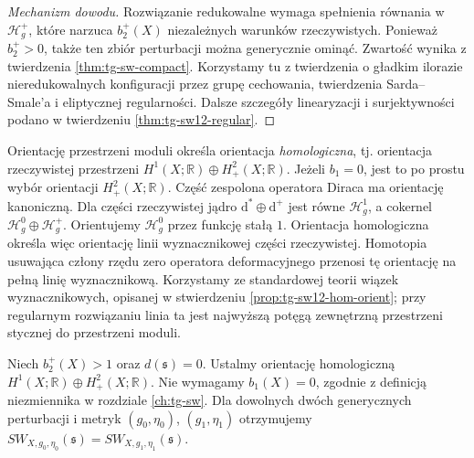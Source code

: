 \begin{proof}[Mechanizm dowodu]
Rozwiązanie redukowalne wymaga spełnienia równania w
$\mathcal H_g^+$, które narzuca $b_2^+(X)$ niezależnych
warunków rzeczywistych. Ponieważ $b_2^+>0$, także ten
zbiór perturbacji można generycznie ominąć.
Zwartość wynika z twierdzenia \ref{thm:tg-sw-compact}.
Korzystamy tu z twierdzenia o gładkim ilorazie
nieredukowalnych konfiguracji przez grupę cechowania,
twierdzenia Sarda--Smale'a i eliptycznej regularności.
Dalsze szczegóły linearyzacji i surjektywności
podano w twierdzeniu \ref{thm:tg-sw12-regular}.
\end{proof}

Orientację przestrzeni moduli określa orientacja
\emph{homologiczna}, tj. orientacja rzeczywistej
przestrzeni $H^1(X;\mathbb R)\oplus H^2_+(X;\mathbb R)$.
Jeżeli $b_1=0$, jest to po prostu wybór orientacji
$H^2_+(X;\mathbb R)$. Część zespolona operatora Diraca ma orientację
kanoniczną. Dla części rzeczywistej jądro
$\mathrm d^*\oplus\mathrm d^+$ jest równe
$\mathcal H^1_g$, a cokernel
$\mathcal H^0_g\oplus\mathcal H^+_g$.
Orientujemy $\mathcal H^0_g$ przez funkcję stałą $1$.
Orientacja homologiczna określa więc orientację
linii wyznacznikowej części rzeczywistej.
Homotopia usuwająca człony rzędu zero operatora
deformacyjnego przenosi tę orientację na pełną
linię wyznacznikową. Korzystamy ze standardowej
teorii wiązek wyznacznikowych, opisanej w
stwierdzeniu \ref{prop:tg-sw12-hom-orient};
przy regularnym rozwiązaniu linia ta jest
najwyższą potęgą zewnętrzną przestrzeni stycznej
do przestrzeni moduli.

\begin{stwierdzenie}
\label{prop:tg-sw-cobordism}
Niech $b_2^+(X)>1$ oraz
$d(\mathfrak s)=0$. Ustalmy orientację homologiczną
$H^1(X;\mathbb R)\oplus H^2_+(X;\mathbb R)$.
Nie wymagamy $b_1(X)=0$, zgodnie z definicją
niezmiennika w rozdziale \ref{ch:tg-sw}.
Dla dowolnych dwóch generycznych perturbacji i metryk
$(g_0,\eta_0)$, $(g_1,\eta_1)$ otrzymujemy
$SW_{X,g_0,\eta_0}(\mathfrak s)
=SW_{X,g_1,\eta_1}(\mathfrak s)$.
\end{stwierdzenie}

